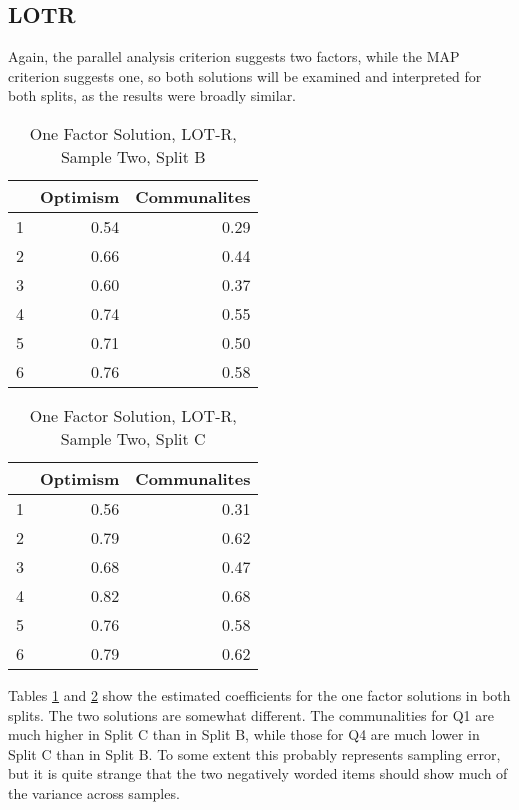 \documentclass{article}
\begin{document}
\subsection{LOTR}
\label{sec:lotr-1}





Again, the parallel analysis criterion suggests two factors, while the MAP criterion suggests one, so both solutions will be examined and interpreted for both splits, as the results were broadly similar. 

\begin{table}[ht]
\centering
\begin{tabular}{rrr}
  \hline
 & Optimism & Communalites \\ 
  \hline
1 & 0.54 & 0.29 \\ 
  2 & 0.66 & 0.44 \\ 
  3 & 0.60 & 0.37 \\ 
  4 & 0.74 & 0.55 \\ 
  5 & 0.71 & 0.50 \\ 
  6 & 0.76 & 0.58 \\ 
   \hline
\end{tabular}
\caption{One Factor Solution, LOT-R, Sample Two, Split B} 
\label{tab:hom2blotr1}
\end{table}

\begin{table}[ht]
\centering
\begin{tabular}{rrr}
  \hline
 & Optimism & Communalites \\ 
  \hline
1 & 0.56 & 0.31 \\ 
  2 & 0.79 & 0.62 \\ 
  3 & 0.68 & 0.47 \\ 
  4 & 0.82 & 0.68 \\ 
  5 & 0.76 & 0.58 \\ 
  6 & 0.79 & 0.62 \\ 
   \hline
\end{tabular}
\caption{One Factor Solution, LOT-R, Sample Two, Split C} 
\label{tab:hom2clotr1}
\end{table}
Tables \ref{tab:hom2blotr1} and \ref{tab:hom2clotr1} show the estimated coefficients for the one factor solutions in both splits. The two solutions are somewhat different. The communalities for Q1 are much higher in Split C than in Split B, while those for Q4 are much lower in Split C than in Split B. To some extent this probably represents sampling error, but it is quite strange that the two negatively worded items should show much of the variance across samples. 
\end{document}
